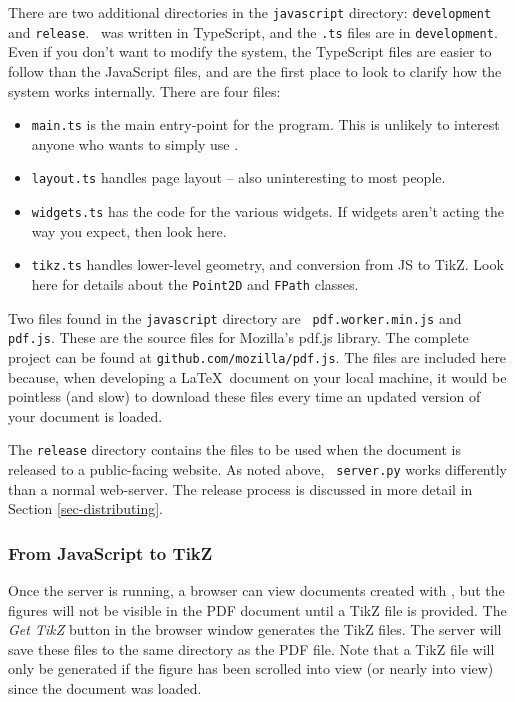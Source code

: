 \documentclass[10pt]{article}
\begin{document}
There are two additional directories in the {\tt javascript} directory:
{\tt development} and {\tt release}. \figput\ was written in
TypeScript, and the {\tt .ts} files are in {\tt development}. Even if
you don't want to modify the system, the TypeScript files are easier
to follow than the JavaScript files, and are the first place to look to
clarify how the system works internally. There are four files:
\begin{itemize}[itemsep=-1pt,leftmargin=1cm]
\item{\tt main.ts} is the main entry-point for the program. This is
  unlikely to interest anyone who wants to simply use \figput.
\item{\tt layout.ts} handles page layout -- also uninteresting to most people.
\item{\tt widgets.ts} has the code for the various widgets. If widgets
  aren't acting the way you expect, then look here.
\item{\tt tikz.ts} handles lower-level geometry, and conversion from
  JS to TikZ. Look here for details about the {\tt Point2D} and
  {\tt FPath} classes.
\end{itemize}

Two files found in the {\tt javascript} directory are {\tt
  pdf.worker.min.js} and {\tt pdf.js}. These are the source files for
Mozilla's pdf.js library. The complete project can be found at
\verb=github.com/mozilla/pdf.js=. The files are included here because,
when developing a \LaTeX\ document on your local machine, it would be
pointless (and slow) to download these files every time an updated
version of your document is loaded.

The {\tt release} directory contains the files to be used when the
document is released to a public-facing website. As noted above, {\tt
  server.py} works differently than a normal web-server. The release
process is discussed in more detail in Section \ref{sec-distributing}.

\subsubsection*{From JavaScript to TikZ}

Once the server is running, a browser can view documents created with
\figput, but the figures will not be visible in
the PDF document until a TikZ file is provided. The \emph{Get TikZ}
button in the browser window generates the TikZ files. The server
will save these files to the same directory as the PDF file. Note that
a TikZ file will only be generated if the figure has been scrolled
into view (or nearly into view) since the document was loaded.
\end{document}
